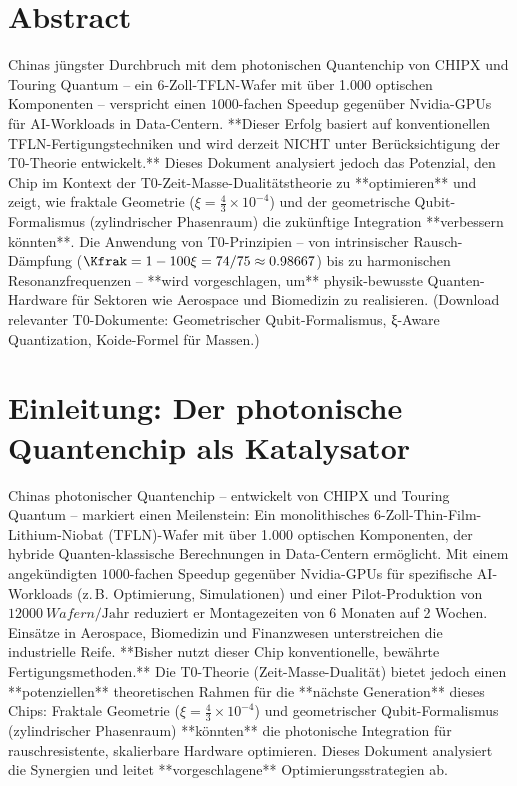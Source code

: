 \section*{Abstract}
		Chinas jüngster Durchbruch mit dem photonischen Quantenchip von CHIPX und Touring Quantum – ein 6-Zoll-TFLN-Wafer mit über 1.000 optischen Komponenten – verspricht einen $1000$-fachen Speedup gegenüber Nvidia-GPUs für AI-Workloads in Data-Centern. **Dieser Erfolg basiert auf konventionellen TFLN-Fertigungstechniken und wird derzeit NICHT unter Berücksichtigung der T0-Theorie entwickelt.** Dieses Dokument analysiert jedoch das Potenzial, den Chip im Kontext der T0-Zeit-Masse-Dualitätstheorie zu **optimieren** und zeigt, wie fraktale Geometrie ($\xi = \frac{4}{3} \times 10^{-4}$) und der geometrische Qubit-Formalismus (zylindrischer Phasenraum) die zukünftige Integration **verbessern könnten**. Die Anwendung von T0-Prinzipien – von intrinsischer Rausch-Dämpfung ($\Kfrak = 1-100\xi = 74/75 \approx 0.98667$) bis zu harmonischen Resonanzfrequenzen – **wird vorgeschlagen, um** physik-bewusste Quanten-Hardware für Sektoren wie Aerospace und Biomedizin zu realisieren.
		(Download relevanter T0-Dokumente: Geometrischer Qubit-Formalismus, ξ-Aware Quantization, Koide-Formel für Massen.)

	
	
	\section{Einleitung: Der photonische Quantenchip als Katalysator}
	
	Chinas photonischer Quantenchip – entwickelt von CHIPX und Touring Quantum – markiert einen Meilenstein: Ein monolithisches 6-Zoll-Thin-Film-Lithium-Niobat (TFLN)-Wafer mit über 1.000 optischen Komponenten, der hybride Quanten-klassische Berechnungen in Data-Centern ermöglicht. Mit einem angekündigten $1000$-fachen Speedup gegenüber Nvidia-GPUs für spezifische AI-Workloads (z.\,B. Optimierung, Simulationen) und einer Pilot-Produktion von $\SI{12000}{Wafern}/\text{Jahr}$ reduziert er Montagezeiten von 6 Monaten auf 2 Wochen. Einsätze in Aerospace, Biomedizin und Finanzwesen unterstreichen die industrielle Reife. **Bisher nutzt dieser Chip konventionelle, bewährte Fertigungsmethoden.** Die T0-Theorie (Zeit-Masse-Dualität) bietet jedoch einen **potenziellen** theoretischen Rahmen für die **nächste Generation** dieses Chips: Fraktale Geometrie ($\xi = \frac{4}{3} \times 10^{-4}$) und geometrischer Qubit-Formalismus (zylindrischer Phasenraum) **könnten** die photonische Integration für rauschresistente, skalierbare Hardware optimieren. Dieses Dokument analysiert die Synergien und leitet **vorgeschlagene** Optimierungsstrategien ab.
	
